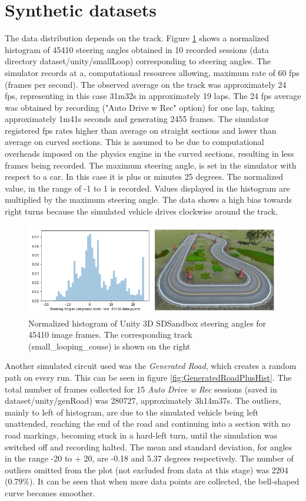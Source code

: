 \section{Synthetic datasets}
The data distribution depends on the track. Figure \ref{fig:GeneratedTrackPlusHist} shows a normalized histogram of 45410 steering angles obtained in 10 recorded sessions (data directory dataset/unity/smallLoop) corresponding to steering angles. The simulator records at a, computational resources allowing, maximum rate of 60 fps (frames per second). The observed average on the track was approximately 24 fps, representing in this case 31m32s  in approximately 19 laps. The 24 fps average was obtained by recording ("Auto Drive w Rec" option) for one lap, taking approximately 1m41s seconds and generating 2455 frames. The simulator registered fps rates higher than average on straight sections and lower than average on curved sections. This is assumed to be due to computational overheads imposed on the physics engine in the curved sections, resulting in less frames being recorded. The maximum steering angle, is set in the simulator with respect to a car. In this case it is plus or minutes 25 degrees. The normalized value, in the range of -1 to 1 is recorded. Values displayed in the histogram are multiplied by the maximum steering angle. The data shows a high bias towards right turns because the simulated vehicle drives clockwise around the track.
\begin{figure}[ht]
 \centering 
 \includegraphics[width=\textwidth]{Figures/GeneratedTrackPlusHistogram.png}
 \caption{Normalized histogram of Unity 3D SDSandbox steering angles for 45410 image frames. The corresponding track (small\_looping\_couse) is shown on the right}
 \label{fig:GeneratedTrackPlusHist}
\end{figure}

Another simulated circuit used was the \textit{Generated Road}, which creates a random path on every run. This can be seen in figure \ref{fig:GeneratedRoadPlusHist}. The total number of frames collected for 15 \textit{Auto Drive w Rec} sessions (saved in dataset/unity/genRoad) was 280727, approximately 3h14m37s. The outliers, mainly to left of histogram, are due to the simulated vehicle being left unattended, reaching the end of the road and continuing into a section with no road markings, becoming stuck in a hard-left turn, until the simulation was switched off and recording halted. The mean and standard deviation, for angles in the range -20 to + 20, are -0.18 and 5.37 degrees respectively. The number of outliers omitted from the plot (not excluded from data at this stage) was 2204 (0.79\%). It can be seen that when more data points are collected, the bell-shaped curve becomes smoother.

